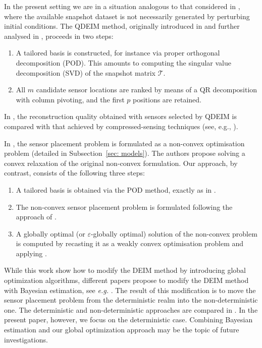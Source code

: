 \documentclass[12pt]{amsart}
\theoremstyle{plain}
\theoremstyle{definition}
\begin{document}
In the present setting we are in a situation analogous to that considered in \cite{manohar2017data}, where the available snapshot dataset is not necessarily generated by perturbing initial conditions. The QDEIM method, originally introduced in \cite{drmac2016new} and further analysed in \cite{manohar2017data}, proceeds in two steps:
\begin{enumerate}
    \item A tailored basis is constructed, for instance via proper orthogonal decomposition (POD). This amounts to computing the singular value decomposition (SVD) of the snapshot matrix $\mathcal{T}$.
    \item All $m$ candidate sensor locations are ranked by means of a QR decomposition with column pivoting, and the first $p$ positions are retained.
\end{enumerate}

In \cite{manohar2017data}, the reconstruction quality obtained with sensors selected by QDEIM is compared with that achieved by compressed-sensing techniques (see, e.g., \cite{candes2006near,candes2006compressive}).

In \cite{Joshi2009}, the sensor placement problem is formulated as a non-convex optimisation problem (detailed in Subsection~\ref{sec: models}). The authors propose solving a convex relaxation of the original non-convex formulation. Our approach, by contrast, consists of the following three steps:
\begin{enumerate}
    \item A tailored basis is obtained via the POD method, exactly as in \cite{manohar2017data}.
    \item The non-convex sensor placement problem is formulated following the approach of \cite{Joshi2009}.
    \item A globally optimal (or $\varepsilon$-globally optimal) solution of the non-convex problem is computed by recasting it as a weakly convex optimisation problem and applying \cite[Algorithm 3]{bednarczuk2026outer}.
\end{enumerate}

While this work show how to modify the DEIM method by introducing global optimization algorithms, different papers propose to modify the DEIM method with Bayesian estimation, see \textit{e.g.} \cite{barklage2024sensor, jiang2026optimization}. The result of this modification is to move the sensor placement problem from the deterministic realm into the non-deterministic one. The deterministic and non-deterministic approaches are compared in \cite{kakasenko2026bridging}. 
In the present paper, however, we focus on the deterministic case. Combining Bayesian estimation and our global optimization approach may be the topic of future investigations.
\end{document}

